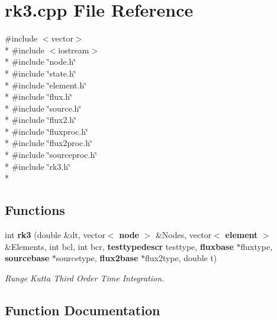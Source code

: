 \section{rk3.\-cpp File Reference}
\label{rk3_8cpp}
{\ttfamily \#include $<$vector$>$}\\*
{\ttfamily \#include $<$iostream$>$}\\*
{\ttfamily \#include \char`\"{}node.\-h\char`\"{}}\\*
{\ttfamily \#include \char`\"{}state.\-h\char`\"{}}\\*
{\ttfamily \#include \char`\"{}element.\-h\char`\"{}}\\*
{\ttfamily \#include \char`\"{}flux.\-h\char`\"{}}\\*
{\ttfamily \#include \char`\"{}source.\-h\char`\"{}}\\*
{\ttfamily \#include \char`\"{}flux2.\-h\char`\"{}}\\*
{\ttfamily \#include \char`\"{}fluxproc.\-h\char`\"{}}\\*
{\ttfamily \#include \char`\"{}flux2proc.\-h\char`\"{}}\\*
{\ttfamily \#include \char`\"{}sourceproc.\-h\char`\"{}}\\*
{\ttfamily \#include \char`\"{}rk3.\-h\char`\"{}}\\*
\subsection*{Functions}
\begin{DoxyCompactItemize}
\item 
int {\bf rk3} (double \&dt, vector$<$ {\bf node} $>$ \&Nodes, vector$<$ {\bf element} $>$ \&Elements, int bcl, int bcr, {\bf testtypedescr} testtype, {\bf fluxbase} $\ast$fluxtype, {\bf sourcebase} $\ast$sourcetype, {\bf flux2base} $\ast$flux2type, double t)
\begin{DoxyCompactList}\small\item\em Runge Kutta Third Order Time Integration. \end{DoxyCompactList}\end{DoxyCompactItemize}


\subsection{Function Documentation}
